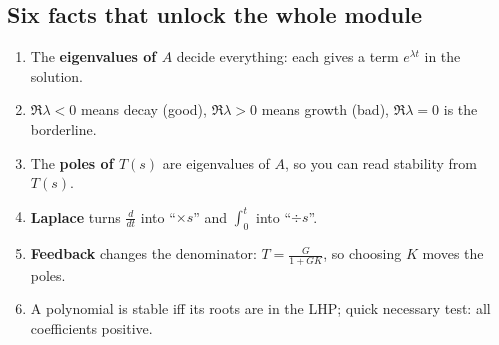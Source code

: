 \subsection*{Six facts that unlock the whole module}
\begin{enumerate}
\item The \textbf{eigenvalues of $A$} decide everything: each gives a term $e^{\lambda t}$ in the solution.
\item $\Re\lambda<0$ means decay (good), $\Re\lambda>0$ means growth (bad), $\Re\lambda=0$ is the borderline.
\item The \textbf{poles of $T(s)$} are eigenvalues of $A$, so you can read stability from $T(s)$.
\item \textbf{Laplace} turns $\frac{d}{dt}$ into ``$\times s$'' and $\int_0^t$ into ``$\div s$''.
\item \textbf{Feedback} changes the denominator: $T=\frac{G}{1+GK}$, so choosing $K$ moves the poles.
\item A polynomial is stable iff its roots are in the LHP; quick necessary test: all coefficients positive.
\end{enumerate}
\newpage
